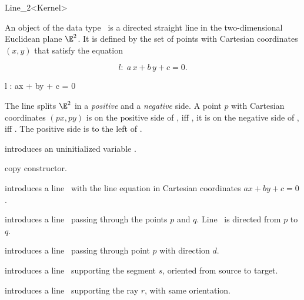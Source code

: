 \begin{ccRefClass} {Line_2<Kernel>}

\ccDefinition
An object  of the data type \ccRefName\ is a directed
straight line in the two-dimensional Euclidean plane $\E^2$. It is
defined by the set of points with Cartesian coordinates $(x,y)$ 
that satisfy the equation 
\begin{ccTexOnly}
\[ l:\; a\, x +b\, y +c = 0. \]
\end{ccTexOnly}
\begin{ccHtmlOnly}
 l : ax + by + c = 0 
\end{ccHtmlOnly}
 
The line splits $\E^2$ in a {\em positive} and a {\em negative}
side. A point $p$ with Cartesian coordinates 
$(px, py)$ is on the positive side of , iff
, it is
on the negative side of , iff 
.
The positive side is to the left of .

\ccCreation
{}

\ccHidden {}
             {introduces an uninitialized variable \ccVar.}

\ccHidden {}
            {copy constructor.}

            {introduces a line \ccVar\ with the line equation in Cartesian
              coordinates $ax +by +c = 0$.}

            {introduces a line \ccVar\ passing through the points $p$ and $q$. 
             Line \ccVar\ is directed from $p$ to $q$.}

            {introduces a line \ccVar\ passing through point $p$ with 
             direction $d$.}

            {introduces a line \ccVar\ supporting the segment $s$,
            oriented from source to target.}

            {introduces a line \ccVar\ supporting the ray $r$,
            with same orientation.}

\ccOperations



\end{ccRefClass}
